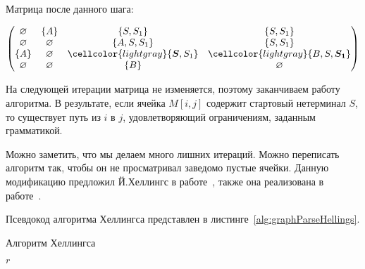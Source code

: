 \begin{example}
Матрица после данного шага:

\[
\begin{pmatrix}
\varnothing & \{A\}       & \{S, S_1\}    & \{S, S_1\}    \\
\varnothing & \varnothing & \{A, S, S_1\} & \{S, S_1\}    \\
\{A\}       & \varnothing & \cellcolor{lightgray}\{\boldsymbol{S}, S_1\}    & \cellcolor{lightgray}\{B, S, \boldsymbol{S_1}\} \\
\varnothing & \varnothing & \{B\}         & \varnothing   \\
\end{pmatrix}
\]

На следующей итерации матрица не изменяется, поэтому заканчиваем работу алгоритма. В результате, если ячейка $M[i, j]$ содержит стартовый нетерминал $S$, то существует путь из $i$ в $j$, удовлетворяющий ограничениям, заданным грамматикой.
\end{example}

Можно заметить, что мы делаем много лишних итераций.
Можно переписать алгоритм так, чтобы он не просматривал заведомо пустые ячейки.
Данную модификацию предложил Й.Хеллингс в работе~\cite{hellingsRelational}, также она реализована в работе~\cite{10.1007/978-3-319-46523-4_38}.

Псевдокод алгоритма Хеллингса представлен в листинге~\ref{alg:graphParseHellings}.

\begin{algorithm}[H]
    \begin{algorithmic}[1]
        \caption{Алгоритм Хеллингса}
        \label{alg:graphParseHellings}

            \EndFor
        \EndFor
            \EndFor
        \EndFor

        \EndWhile
        \State \Return $r$
        \EndFunction
    \end{algorithmic}
\end{algorithm}


